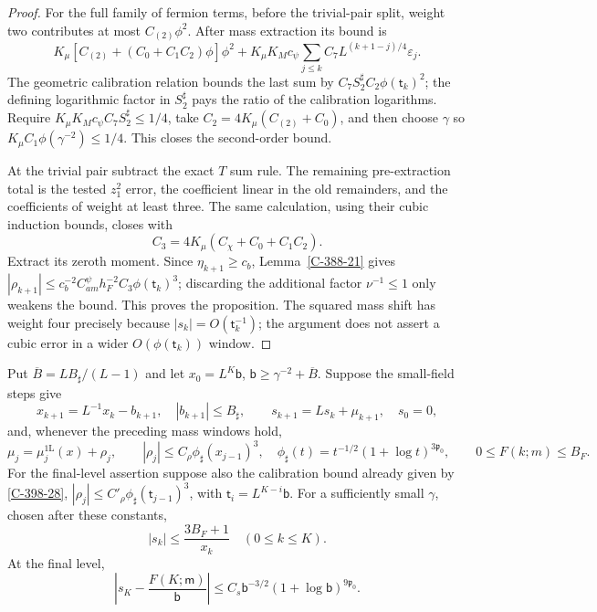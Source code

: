 \documentclass[11pt,letterpaper,reqno]{amsart}
\makeatletter
\theoremstyle{definition}
\newcommand{\ms@minorstart}{%
  \pushQED{\qed}\renewcommand{\qedsymbol}{$\blacksquare$}}
\newenvironment{proposition}[1][]{\ms@minorstart\ms@proposition[#1]}
  {\popQED\endms@proposition}
\theoremstyle{remark}
\makeatother
\begin{document}
\begin{proof}
For the full family of fermion terms, before the
trivial-pair split, weight two contributes at most
$C_{(2)}\phi^2$.  After mass extraction its bound is
\[
 K_\mu[C_{(2)}+(C_0+C_1C_2)\phi]\phi^2+
 K_\mu K_Mc_\psi\sum_{j\le k}C_7L^{(k+1-j)/4}
                                    \varepsilon_j.
\]
The geometric calibration relation bounds the last
sum by $C_7S_2^\sharp C_2\phi(\mathsf t_k)^2$; the defining
logarithmic factor in $S_2^\sharp$ pays the ratio of the
calibration logarithms.
Require $K_\mu K_Mc_\psi C_7S_2^\sharp\le1/4$,
take $C_2=4K_\mu(C_{(2)}+C_0)$, and then choose
$\gamma$ so $K_\mu C_1\phi(\gamma^{-2})\le1/4$.
This closes the second-order bound.

At the trivial pair subtract the exact $T$ sum rule.
The remaining pre-extraction total is the tested
$z_1^2$ error, the coefficient linear in the old
remainders, and the coefficients of weight at least
three.  The same calculation, using their cubic
induction bounds, closes with
\[
 C_3=4K_\mu(C_\chi+C_0+C_1C_2).
\]
Extract its zeroth moment.  Since $\eta_{k+1}\ge c_b$,
Lemma~\ref{C-388-21} gives
$|\rho_{k+1}|\le
c_b^{-2}C^\psi_{am}h_F^{-2}C_3\phi(\mathsf t_k)^3$;
discarding the additional factor $\nu^{-1}\le1$
only weakens the bound.  This proves the proposition.
The squared mass shift has weight four precisely
because $|s_k|=O(\mathsf t_k^{-1})$; the argument does not
assert a cubic error in a wider $O(\phi(\mathsf t_k))$ window.
\end{proof}

\begin{proposition}[Closing the forward mass flow]\label{C-396-33}
Put $\overline B=LB_\sharp/(L-1)$ and let
$x_0=L^K\mathsf b$, $\mathsf b\ge\gamma^{-2}+\overline B$.
Suppose the small-field steps give
\[
 x_{k+1}=L^{-1}x_k-b_{k+1},\quad |b_{k+1}|\le B_\sharp,
 \qquad s_{k+1}=Ls_k+\mu_{k+1},\quad s_0=0,
\]
and, whenever the preceding mass windows hold,
\[
 \mu_j=\mu_j^{\mathrm{1L}}(x)+\rho_j,\qquad
 |\rho_j|\le C_\rho\phi_\sharp(x_{j-1})^3,
 \quad \phi_\sharp(t)=t^{-1/2}(1+\log t)^{3\mathfrak p_0},
 \qquad 0\le F(k;m)\le B_F.
\]
For the final-level assertion suppose also the calibration
bound already given by \cref{C-398-28},
$|\rho_j|\le C'_\rho\phi_\sharp(\mathsf t_{j-1})^3$, with
$\mathsf t_i=L^{K-i}\mathsf b$. For a sufficiently small $\gamma$, chosen
after these constants,
\[
 |s_k|\le\frac{3B_F+1}{x_k}\quad(0\le k\le K).
\]
At the final level,
\[
 \left|s_K-\frac{F(K;\mathsf m)}{\mathsf b}\right|
 \le C_s\mathsf b^{-3/2}(1+\log\mathsf b)^{9\mathfrak p_0}.
\]
\end{proposition}
\end{document}
